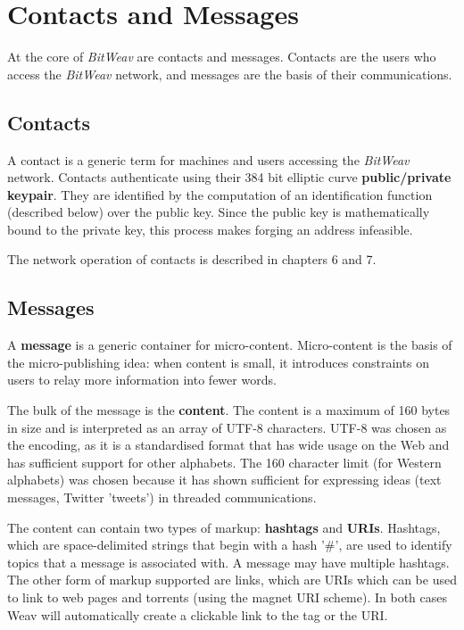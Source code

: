 \documentclass[10pt,a4paper,onecolumn]{article}
\begin{document}
\section{Contacts and Messages}
At the core of \textit{BitWeav} are contacts and messages. Contacts are the users who access the \textit{BitWeav} network, and messages are the basis of their communications.

\subsection*{Contacts}
A contact is a generic term for machines and users accessing the \textit{BitWeav} network. Contacts authenticate using their 384 bit elliptic curve \textbf{public/private keypair}. They are identified by the computation of an identification function (described below) over the public key. Since the public key is mathematically bound to the private key, this process makes forging an address infeasible.

The network operation of contacts is described in chapters 6 and 7.

\subsection*{Messages}
A \textbf{message} is a generic container for micro-content. Micro-content is the basis of the micro-publishing idea: when content is small, it introduces constraints on users to relay more information into fewer words.

The bulk of the message is the \textbf{content}. The content is a maximum of 160 bytes in size and is interpreted as an array of UTF-8 characters. UTF-8 was chosen as the encoding, as it is a standardised format that has wide usage on the Web and has sufficient support for other alphabets. The 160 character limit (for Western alphabets) was chosen because it has shown sufficient for expressing ideas (text messages, Twitter 'tweets') in threaded communications. 

The content can contain two types of markup: \textbf{hashtags} and \textbf{URIs}. Hashtags, which are space-delimited strings that begin with a hash '\#', are used to identify topics that a message is associated with. A message may have multiple hashtags. The other form of markup supported are links, which are URIs which can be used to link to web pages and torrents (using the magnet URI scheme). In both cases Weav will automatically create a clickable link to the tag or the URI.
\end{document}
